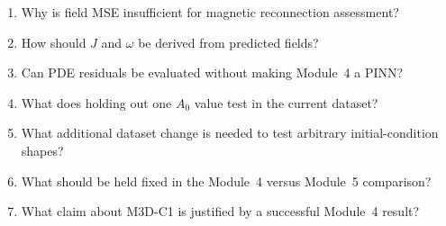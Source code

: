 \documentclass[11pt]{article}
\begin{document}
\begin{enumerate}[label=\textbf{Q\arabic*.}]
  \item Why is field MSE insufficient for magnetic reconnection assessment?
  \item How should $J$ and $\omega$ be derived from predicted fields?
  \item Can PDE residuals be evaluated without making Module~4 a PINN?
  \item What does holding out one $A_0$ value test in the current dataset?
  \item What additional dataset change is needed to test arbitrary initial-condition shapes?
  \item What should be held fixed in the Module~4 versus Module~5 comparison?
  \item What claim about M3D-C1 is justified by a successful Module~4 result?
\end{enumerate}
\end{document}
